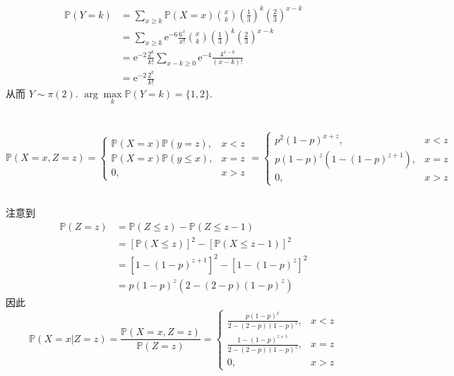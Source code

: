 \documentclass[8pt]{article}
\theoremstyle{compact}
\def\le{\leqslant}
\def\ge{\geqslant}
\def\P#1{\mathbb{P}\left({#1}\right)}
\def\e{\mathrm{e}}
\begin{document}
\section{}
\begin{equation}
	\begin{split}
		\P{Y = k} &= \sum_{x \ge k} \P{X = x} \binom{x}{k}\left(\frac13\right)^k\left(\frac23\right)^{x-k}\\
		&= \sum_{x \ge k} \e^{-6}\frac{6^x}{x!} \binom{x}{k}\left(\frac13\right)^k\left(\frac23\right)^{x-k}\\
		&= \e^{-2}\frac{2^k}{k!}\sum_{x - k \ge 0} \e^{-4}\frac{4^{x-k}}{(x-k)!}\\
		&= \e^{-2}\frac{2^k}{k!}
	\end{split}
\end{equation}
从而 $Y \sim \pi(2)$. $\arg\max\limits_k \P{Y = k} = \{1, 2\}$.

\section{}
\subsection{}
\begin{equation}
	\P{X = x, Z = z} = \begin{cases}
		\P{X = x}\P{y = z}, & x < z\\
		\P{X = x}\P{y \le x}, & x = z\\
		0, & x > z
	\end{cases}
	= \begin{cases}
		p^2(1-p)^{x + z}, & x < z\\
		p(1-p)^{z}(1 - (1-p)^{z+1}), & x = z\\
		0, & x > z
	\end{cases}
\end{equation}
\subsection{}
注意到
\begin{equation}
	\begin{split}
		\P{Z = z} &= \P{Z \le z} - \P{Z \le z - 1} \\
		&= \left[\P{X \le z}\right]^2 - \left[\P{X \le z - 1}\right]^2 \\
		&= [1 - (1-p)^{z+1}]^2 - [1 - (1-p)^{z}]^2\\
		&= p(1-p)^z(2 - (2 - p)(1 - p)^z)
	\end{split}
\end{equation}
因此
\begin{equation}
	\P{X = x | Z = z} = \frac{\P{X = x, Z = z}}{\P{Z = z}} = \begin{cases}
		\frac{p(1-p)^x}{2 - (2-p)(1-p)^{z}}, & x < z \\
		\frac{1 - (1-p)^{z+1}}{2 - (2-p)(1-p)^{z}}, & x = z\\
		0, & x > z
	\end{cases}
\end{equation}
\end{document}
